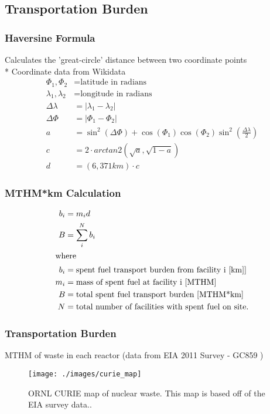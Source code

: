 \subsection{Transportation Burden}

\begin{frame}
	\frametitle{Haversine Formula}
	Calculates the 'great-circle' distance between two coordinate points\\
	* Coordinate data from Wikidata
	\begin{align} 
	\Phi_1,\Phi_2&= \mbox{latitude in radians}\\
	\lambda_1,\lambda_2 &= \mbox{longitude in radians}\\
	\Delta\lambda &= \left|\lambda_1 - \lambda_2\right|\\
	\Delta\Phi &= \left|\Phi_1 - \Phi_2\right|\\
	a&=\sin^2(\Delta\Phi)+\cos(\Phi_1)\cos(\Phi_2)\sin^2{\left(\frac{\Delta\lambda}{2}\right)}\\
	c &= 2 \cdot arctan2(\sqrt{a},\sqrt{1-a})\\
	d &=  (6,371km) \cdot c
	\end{align}
	
\end{frame}

\begin{frame}
	\frametitle{MTHM*km Calculation}
	\begin{align}
	b_i &= m_id\\
	B &= \sum_i^N b_i\\
	\intertext{where}
	b_i &= \mbox{spent fuel transport burden from facility i [km]]}\\
	m_i &= \mbox{mass of spent fuel at facility i [MTHM]}\\
	B &= \mbox{total spent fuel transport burden [MTHM*km]}\\
	N &= \mbox{total number of facilities with spent fuel on site.}
	\end{align}
\end{frame}

\begin{frame}
	\frametitle{Transportation Burden}
	MTHM of waste in each reactor (data from EIA 2011 Survey - GC859 \cite{domenico_gc-859_2016})
	\begin{figure}[htbp!]
		\begin{center}
			\texttt{[image: ./images/curie\_map]}
		\end{center}
		\caption{ORNL CURIE map of nuclear waste. This map is based off of the EIA survey data.\cite{ornl_centralized_2016}.}
		\label{fig:curie_map}
	\end{figure}

\end{frame}

